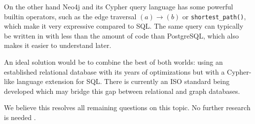 \documentclass[11pt, a4paper,oneside,chapterprefix=false]{scrbook}
\begin{document}
On the other hand Neo4j and its Cypher query language has some powerful builtin operators, such as the edge traversal $(a) \rightarrow (b)$ or \lstinline{shortest_path()}, which make it very expressive compared to SQL.
The same query can typically be written in with less than the amount of code than PostgreSQL, which also makes it easier to understand later.

An ideal solution would be to combine the best of both worlds: using an established relational database with its years of optimizations but with a Cypher-like language extension for SQL.
There is currently an ISO standard being developed \cite{sqlpgd} which may bridge this gap between relational and graph databases.

We believe this resolves all remaining questions on this topic. No further research is needed \cite{xkcdresearch}.



\end{document}
